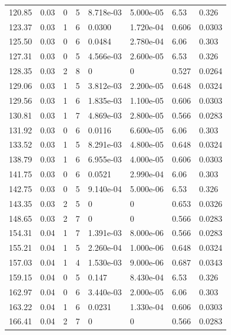 \documentclass[preview]{standalone}
\begin{document}
{{{\begin{tabular}{L{1.2cm}C{1.2cm} C{0.3cm}C{0.5cm} C{1.4cm}C{1.4cm} C{1.4cm}C{1.4cm}}
  120.85  &  0.03  & 0     &  5 &  8.718e-03  & 5.000e-05  & 6.53 &  0.326   \\ 
  123.37  &  0.03  & 1     &  6 &  0.0300  & 1.720e-04  & 0.606 &  0.0303   \\ 
  125.50  &  0.03  & 0     &  6 &  0.0484  & 2.780e-04  & 6.06 &  0.303   \\ 
  127.31  &  0.03  & 0     &  5 &  4.566e-03  & 2.600e-05  & 6.53 &  0.326   \\ 
  128.35  &  0.03  & 2     &  8 &  0  & 0  & 0.527 &  0.0264   \\ 
  129.06  &  0.03  & 1     &  5 &  3.812e-03  & 2.200e-05  & 0.648 &  0.0324   \\ 
  129.56  &  0.03  & 1     &  6 &  1.835e-03  & 1.100e-05  & 0.606 &  0.0303   \\ 
  130.81  &  0.03  & 1     &  7 &  4.869e-03  & 2.800e-05  & 0.566 &  0.0283   \\ 
  131.92  &  0.03  & 0     &  6 &  0.0116  & 6.600e-05  & 6.06 &  0.303   \\ 
  133.52  &  0.03  & 1     &  5 &  8.291e-03  & 4.800e-05  & 0.648 &  0.0324   \\ 
  138.79  &  0.03  & 1     &  6 &  6.955e-03  & 4.000e-05  & 0.606 &  0.0303   \\ 
  141.75  &  0.03  & 0     &  6 &  0.0521  & 2.990e-04  & 6.06 &  0.303   \\ 
  142.75  &  0.03  & 0     &  5 &  9.140e-04  & 5.000e-06  & 6.53 &  0.326   \\ 
  143.35  &  0.03  & 2     &  5 &  0  & 0  & 0.653 &  0.0326   \\ 
  148.65  &  0.03  & 2     &  7 &  0  & 0  & 0.566 &  0.0283   \\ 
  154.31  &  0.04  & 1     &  7 &  1.391e-03  & 8.000e-06  & 0.566 &  0.0283   \\ 
  155.21  &  0.04  & 1     &  5 &  2.260e-04  & 1.000e-06  & 0.648 &  0.0324   \\ 
  157.03  &  0.04  & 1     &  4 &  1.530e-03  & 9.000e-06  & 0.687 &  0.0343   \\ 
  159.15  &  0.04  & 0     &  5 &  0.147  & 8.430e-04  & 6.53 &  0.326   \\ 
  162.97  &  0.04  & 0     &  6 &  3.440e-03  & 2.000e-05  & 6.06 &  0.303   \\ 
  163.22  &  0.04  & 1     &  6 &  0.0231  & 1.330e-04  & 0.606 &  0.0303   \\ 
  166.41  &  0.04  & 2     &  7 &  0  & 0  & 0.566 &  0.0283   \\ 

\end{tabular}}}}
\end{document}
